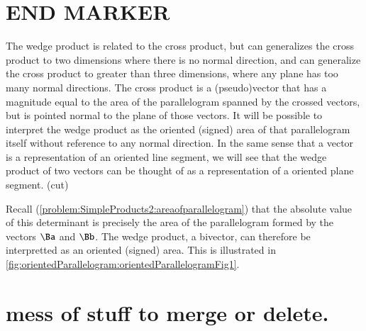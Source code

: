 \section{END MARKER}

The wedge product is related to the cross product, but can generalizes the cross product to two dimensions where there is no normal direction, and can generalize the cross product to greater than three dimensions, where any plane has too many normal directions.
The cross product is a (pseudo)vector that has a magnitude equal to the area of the parallelogram spanned by the crossed vectors, but is pointed normal to the plane of those vectors.
It will be possible to interpret the wedge product as the oriented (signed) area of that parallelogram itself without reference to any normal direction.
In the same sense that a vector is a representation of an oriented line segment, we will see that the wedge product of two vectors can be thought of as a representation of a oriented plane segment.
(cut)

Recall (\cref{problem:SimpleProducts2:areaofparallelogram}) that the absolute value of this determinant is precisely the area of the parallelogram formed by the vectors \( \Ba \) and \( \Bb \).  The wedge product, a bivector, can therefore be interpretted as an oriented (signed) area.  This is illustrated in \cref{fig:orientedParallelogram:orientedParallelogramFig1}.





\section{mess of stuff to merge or delete.}

